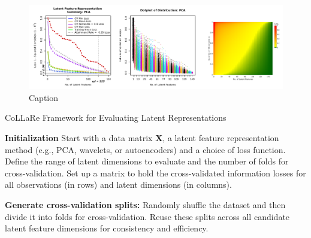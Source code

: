 \begin{figure}
    \centering
    \includegraphics[width=1\linewidth]{figures/dist-summaries.pdf}
    \caption{Caption}
    \label{fig:enter-label}
\end{figure}

\begin{algorithm}
\caption{CoLLaRe Framework for Evaluating Latent Representations}
\begin{algorithmic}[1]

\State \textbf{Initialization} Start with a data matrix $\mathbf{X}$, a latent feature representation method (e.g., PCA, wavelets, or autoencoders) and a choice of loss function. Define the range of latent dimensions to evaluate and the number of folds for cross-validation. Set up a matrix to hold the cross-validated information losses for all observations (in rows) and latent dimensions (in columns).

\State \textbf{Generate cross-validation splits:} Randomly shuffle the dataset and then divide it into folds for cross-validation. Reuse these splits across all candidate latent feature dimensions for consistency and efficiency.


\end{algorithmic}
\end{algorithm}
